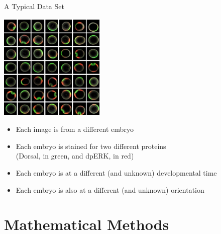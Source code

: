 \documentclass[10pt]{beamer}
\begin{document}
\begin{frame}{A Typical Data Set}
\begin{center}
\includegraphics[width=2in]{fig2a}
\end{center}

\begin{itemize}
\item Each image is from a different embryo
\item Each embryo is stained for two different proteins\\ (Dorsal, in green, and dpERK, in red)
\item Each embryo is at a different (and unknown) developmental time
\item Each embryo is also at a different (and unknown) orientation
\end{itemize}
\end{frame}

\section{Mathematical Methods}
\end{document}
